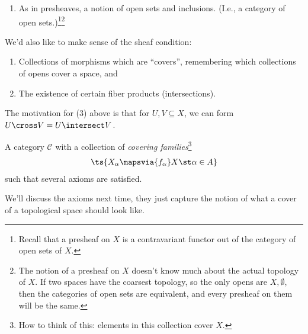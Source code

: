\begin{answer}

\envlist

\begin{enumerate}
\def\labelenumi{\arabic{enumi}.}
\tightlist
\item
  As in presheaves, a notion of open sets and inclusions. (I.e., a
  category of open sets.)\footnote{Recall that a presheaf on \(X\) is a
    contravariant functor out of the category of open sets of \(X\).}\footnote{The
    notion of a presheaf on \(X\) doesn't know much about the actual
    topology of \(X\). If two spaces have the coarsest topology, so the
    only opens are \(X, \emptyset\), then the categories of open sets
    are equivalent, and every presheaf on them will be the same.}
\end{enumerate}

We'd also like to make sense of the sheaf condition:

\begin{enumerate}
\def\labelenumi{\arabic{enumi}.}
\setcounter{enumi}{1}
\item
  Collections of morphisms which are ``covers'', remembering which
  collections of opens cover a space, and
\item
  The existence of certain fiber products (intersections).
\end{enumerate}

\end{answer}

\begin{remark}

The motivation for (3) above is that for \(U, V \subseteq X\), we can
form \(U\cross V = U\intersect V\).

\end{remark}

\begin{definition}

A category \(\mathcal{C}\) with a collection of \emph{covering
families}\footnote{How to think of this: elements in this collection
  cover \(X\).}
\begin{align*}
\ts{X_\alpha \mapsvia{f_\alpha} X \st \alpha\in A}
\end{align*} such that several axioms are satisfied.

\end{definition}

We'll discuss the axioms next time, they just capture the notion of what
a cover of a topological space should look like.


